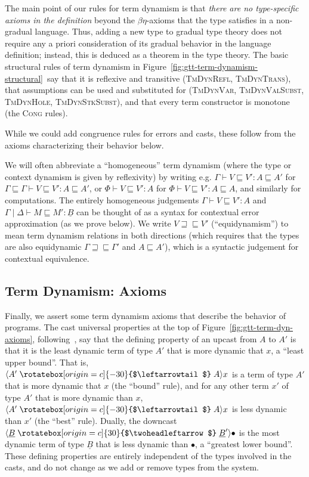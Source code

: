 \documentclass[acmsmall,nonacm]{acmart}
\newif\ifshort
\newif\iflong
\renewcommand{\u}{\underline}
\newcommand{\ltdyn}{\sqsubseteq}
\newcommand{\gtdyn}{\sqsupseteq}
\newcommand{\equidyn}{\mathrel{\gtdyn\ltdyn}}
\newcommand{\uarrow}{\mathrel{\rotatebox[origin=c]{-30}{$\leftarrowtail$}}}
\newcommand{\darrow}{\mathrel{\rotatebox[origin=c]{30}{$\twoheadleftarrow$}}}
\newcommand{\upcast}[2]{\langle{#2}\uarrow{#1}\rangle}
\newcommand{\dncast}[2]{\langle{#1}\darrow{#2}\rangle}
\begin{document}
The main point of our rules for term dynamism is that \emph{there are no
  type-specific axioms in the definition} beyond the $\beta\eta$-axioms
that the type satisfies in a non-gradual language.  Thus, adding a new
type to gradual type theory does not require any a priori consideration
of its gradual behavior in the language definition; instead, this is
deduced as a theorem in the type theory.  The basic structural rules of
term dynamism in Figure~\ref{fig:gtt-term-dynamism-structural}\iflong\ and Figure~\ref{fig:gtt-term-dynamism-ext-congruence}\fi\ say that
it is reflexive and transitive (\textsc{TmDynRefl},
\textsc{TmDynTrans}), that assumptions can be used and substituted for
(\textsc{TmDynVar}, \textsc{TmDynValSubst}, \textsc{TmDynHole},
\textsc{TmDynStkSubst}), and that every term constructor is monotone
(the \textsc{Cong} rules).
\begin{longonly}
While we could add congruence rules for errors and casts,
these follow from the axioms characterizing their behavior below.  
\end{longonly}

We will often abbreviate a ``homogeneous'' term dynamism (where the type
or context dynamism is given by reflexivity) by writing e.g. $\Gamma
\vdash V \ltdyn V' : A \ltdyn A'$ for $\Gamma \ltdyn \Gamma \vdash V
\ltdyn V' : A \ltdyn A'$, or $\Phi \vdash V \ltdyn V' : A$ for $\Phi
\vdash V \ltdyn V' : A \ltdyn A$, and similarly for computations.  The
entirely homogeneous judgements $\Gamma \vdash V \ltdyn V' : A$ and
$\Gamma \mid \Delta \vdash M \ltdyn M' : \u B$ can be thought of as a
syntax for contextual error approximation (as we prove below).  We write
$V \equidyn V'$ (``equidynamism'') to mean term dynamism relations in
both directions (which requires that the types are also equidynamic
$\Gamma \equidyn \Gamma'$ and $A \ltdyn A'$), which is a syntactic
judgement for contextual equivalence.

\ifshort \vspace{-0.1in} \fi
\subsection{Term Dynamism: Axioms}

Finally, we assert some term dynamism axioms that describe the behavior
of programs.  The cast universal properties at the top of
Figure~\ref{fig:gtt-term-dyn-axioms}, following~\citet{newlicata2018-fscd}, say that
the defining property of an upcast from $A$ to $A'$ is that it is the
least dynamic term of type $A'$ that is more dynamic that $x$, a ``least
upper bound''.  That is, $\upcast{A}{A'}{x}$ is a term of type $A'$ that
is more dynamic that $x$ (the ``bound'' rule), and for any other term
$x'$ of type $A'$ that is more dynamic than $x$, $\upcast{A}{A'}{x}$ is
less dynamic than $x'$ (the ``best'' rule). Dually, the downcast
$\dncast{\u B}{\u B'}{\bullet}$ is the most dynamic term of type $\u B$
that is less dynamic than $\bullet$, a ``greatest lower bound''.  These
defining properties are entirely independent of the types involved in
the casts, and do not change as we add or remove types from the system.
\end{document}
